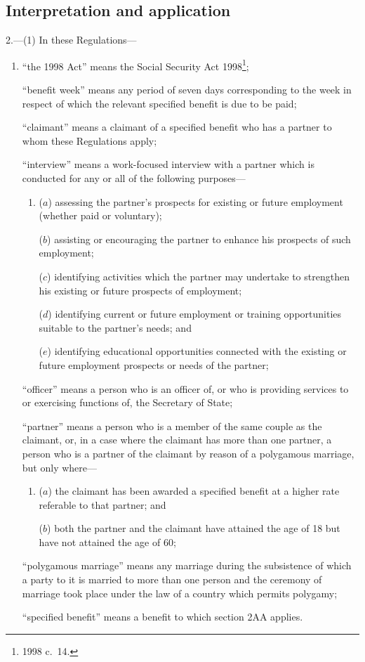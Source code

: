 \documentclass[12pt,a4paper]{article}
\begin{document}
\subsection[2. Interpretation and application]{Interpretation and application}

2.---(1)  In these Regulations—
\begin{enumerate}\item[]
“the 1998 Act” means the Social Security Act 1998\footnote{1998 c.~14.};

“benefit week” means any period of seven days corresponding to the week in respect of which the relevant specified benefit is due to be paid;

“claimant” means a claimant of a specified benefit who has a partner to whom these Regulations apply;

“interview” means a work-focused interview with a partner which is conducted for any or all of the following purposes—
\begin{enumerate}\item[]
($a$) 
assessing the partner’s prospects for existing or future employment (whether paid or voluntary);

($b$) 
assisting or encouraging the partner to enhance his prospects of such employment;

($c$) 
identifying activities which the partner may undertake to strengthen his existing or future prospects of employment;

($d$) 
identifying current or future employment or training opportunities suitable to the partner’s needs; and

($e$) 
identifying educational opportunities connected with the existing or future employment prospects or needs of the partner;
\end{enumerate}

“officer” means a person who is an officer of, or who is providing services to or exercising functions of, the Secretary of State;

“partner” means a person who is a member of the same couple as the claimant, or, in a case where the claimant has more than one partner, a person who is a partner of the claimant by reason of a polygamous marriage, but only where—
\begin{enumerate}\item[]
($a$) 
the claimant has been awarded a specified benefit at a higher rate referable to that partner; and

($b$) 
both the partner and the claimant have attained the age of 18 but have not attained the age of 60;
\end{enumerate}

“polygamous marriage” means any marriage during the subsistence of which a party to it is married to more than one person and the ceremony of marriage took place under the law of a country which permits polygamy;

“specified benefit” means a benefit to which section 2AA applies.
\end{enumerate}
\end{document}
